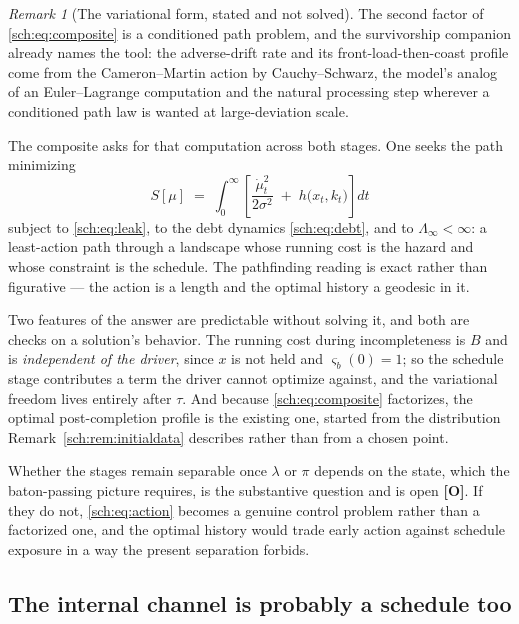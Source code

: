 \documentclass[11pt]{article}
\theoremstyle{plain}
\theoremstyle{definition}
\theoremstyle{remark}
\newtheorem{remark}[theorem]{Remark}
\begin{document}
\begin{remark}[The variational form, stated and not solved]
\label{sch:rem:variational}
The second factor of \eqref{sch:eq:composite} is a conditioned path
problem, and the survivorship companion \cite{SurvA} already names the tool: the
adverse-drift rate and its front-load-then-coast profile come from the
Cameron--Martin action by Cauchy--Schwarz, the model's analog of an
Euler--Lagrange computation and the natural processing step wherever a
conditioned path law is wanted at large-deviation scale.

The composite asks for that computation across both stages. One seeks
the path minimizing
\begin{equation}\label{sch:eq:action}
S[\mu]\;=\;\int_0^{\infty}\left[\frac{\dot\mu_t^{2}}{2\sigma^{2}}
\;+\;h\bigl(x_t,k_t\bigr)\right]dt
\end{equation}
subject to \eqref{sch:eq:leak}, to the debt dynamics
\eqref{sch:eq:debt}, and to $\Lambda_\infty<\infty$: a least-action path
through a landscape whose running cost is the hazard and whose
constraint is the schedule. The pathfinding reading is exact rather than
figurative --- the action is a length and the optimal history a geodesic
in it.

Two features of the answer are predictable without solving it, and both
are checks on a solution's behavior. The running cost during
incompleteness is $B$ and is \emph{independent of the driver}, since $x$
is not held and $\varsigma_b(0)=1$; so the schedule stage contributes a
term the driver cannot optimize against, and the variational freedom
lives entirely after $\tau$. And because \eqref{sch:eq:composite}
factorizes, the optimal post-completion profile is the existing one,
started from the distribution Remark~\ref{sch:rem:initialdata}
describes rather than from a chosen point.

Whether the stages remain separable once $\lambda$ or $\pi$ depends on
the state, which the baton-passing picture requires, is the
substantive question and is open \textbf{[O]}. If they do not,
\eqref{sch:eq:action} becomes a genuine control problem rather than a
factorized one, and the optimal history would trade early action against
schedule exposure in a way the present separation forbids.
\end{remark}

\subsection{The internal channel is probably a schedule too}
\label{sch:subsub:internalschedule}
\end{document}
